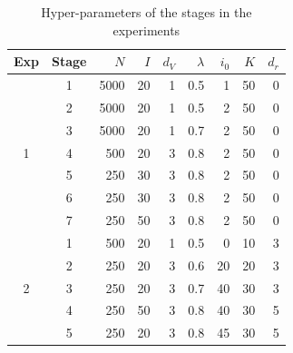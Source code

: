 \documentclass[twocolumn]{phdsymp} %
\begin{document}
\begin{table}[]
\centering
\caption{Hyper-parameters of the stages in the experiments}
\label{tab:stages}
\begin{tabular}{cc|rrrrrrr}
\textbf{Exp}&\textbf{Stage} & \textbf{$N$}  & \textbf{$I$} & \textbf{$d_V$} & \textbf{$\lambda$}& \textbf{$i_0$}&$K$ &$d_r$\\ \hline
& 1     & 5000 & 20  & 1     & 0.5  & 1 &  50  & 0\\
& 2     & 5000 & 20  & 1     & 0.5  & 2 &  50  & 0\\
& 3     & 5000 & 20  & 1     & 0.7  & 2 &  50  & 0\\
1 & 4     & 500  & 20  & 3     & 0.8  & 2 & 50 & 0  \\
& 5     & 250  & 30  & 3     & 0.8  & 2 &  50  & 0\\
& 6     & 250  & 30  & 3     & 0.8  & 2 &  50  & 0\\
& 7     & 250  & 50  & 3     & 0.8  & 2 &  50  & 0\\
\hline
& 1     & 500 & 20  & 1     & 0.5  & 0 & 10    & 3\\
& 2     & 250 & 20  & 3     & 0.6  & 20 & 20   & 3 \\
2 & 3     & 250 & 20  & 3     & 0.7  & 40 & 30 & 3  \\
& 4     & 250  & 50  & 3     & 0.8  & 40 & 30  & 5 \\
& 5     & 250  & 20  & 3     & 0.8  & 45 & 30  & 5 \\
\hline    
\end{tabular}
\end{table}
\end{document}
